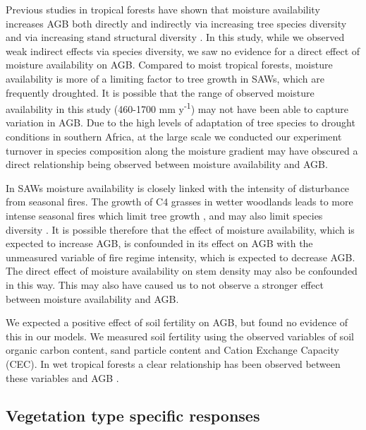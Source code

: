 \documentclass[11pt,a4paper]{article}
\newcommand{\textapprox}{\raisebox{0.5ex}{\texttildelow}}  %
\begin{document}
Previous studies in tropical forests have shown that moisture availability increases AGB both directly and indirectly via increasing tree species diversity and via increasing stand structural diversity \citep{Ali2019a, Ali2019b, Poorter2017}. In this study, while we observed weak indirect effects via species diversity, we saw no evidence for a direct effect of moisture availability on AGB. Compared to moist tropical forests, moisture availability is more of a limiting factor to tree growth in SAWs, which are frequently droughted. It is possible that the range of observed moisture availability in this study (\textapprox{}460-1700 mm y\textsuperscript{-1}) may not have been able to capture variation in AGB. Due to the high levels of adaptation of tree species to drought conditions in southern Africa, at the large scale we conducted our experiment turnover in species composition along the moisture gradient may have obscured a direct relationship being observed between moisture availability and AGB.

In SAWs moisture availability is closely linked with the intensity of disturbance from seasonal fires. The growth of C4 grasses in wetter woodlands leads to more intense seasonal fires which limit tree growth \citep{Charles-Dominique2018}, and may also limit species diversity \citep{Linder2014}. It is possible therefore that the effect of moisture availability, which is expected to increase AGB, is confounded in its effect on AGB with the unmeasured variable of fire regime intensity, which is expected to decrease AGB. The direct effect of moisture availability on stem density may also be confounded in this way. This may also have caused us to not observe a stronger effect between moisture availability and AGB.

We expected a positive effect of soil fertility on AGB, but found no evidence of this in our models. We measured soil fertility using the observed variables of soil organic carbon content, sand particle content and Cation Exchange Capacity (CEC). In wet tropical forests a clear relationship has been observed between these variables and AGB \citep{Slik2009, Coelho-de-Souza2019}. 

\subsection{Vegetation type specific responses}
\end{document}

